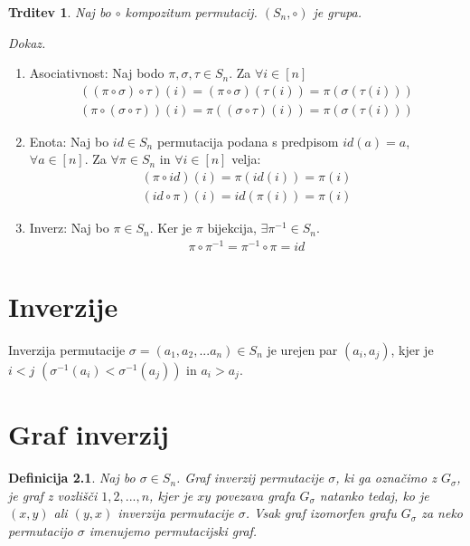 \documentclass[a4paper, 12pt]{book}
\newtheorem{definicija}{Definicija}[chapter]
\newtheorem{trditev}{Trditev}[chapter]
\newenvironment{dokaz}{\emph{Dokaz.}\ }{\hspace{\fill}{$\Box$}}
\begin{document}
\begin{trditev}
    Naj bo $\circ$ kompozitum permutacij. $(S_n, \circ)$ je grupa.
\end{trditev}
\begin{dokaz}
    \begin{enumerate}
        \item Asociativnost: Naj bodo $\pi, \sigma, \tau \in S_n$. Za $\forall i \in [n]$ 
        \begin{align}
            ((\pi \circ \sigma) \circ \tau)(i) = (\pi \circ \sigma)(\tau(i)) = \pi(\sigma(\tau(i)))\\
            (\pi \circ (\sigma \circ \tau))(i) = \pi((\sigma \circ \tau)(i)) = \pi(\sigma(\tau(i))) 
        \end{align}
        \item Enota: Naj bo $id \in S_n$ permutacija podana s predpisom $id(a) = a$, $\forall a \in [n]$. Za $\forall \pi \in S_n$ in $\forall i \in [n]$ velja:
        \begin{align}
            (\pi \circ id)(i) = \pi(id(i)) = \pi(i) \\
            (id \circ \pi)(i) = id(\pi(i)) = \pi(i)
        \end{align}
        \item Inverz: Naj bo $\pi \in S_n$. Ker je $\pi$ bijekcija, $\exists \pi^{-1} \in S_n$.
        \begin{align}
            \pi \circ \pi^{-1} = \pi^{-1} \circ \pi = id
        \end{align}
    \end{enumerate}
\end{dokaz}

\chapter{ Inverzije }

Inverzija permutacije $\sigma = (a_1, a_2,... a_n) \in S_n$ je urejen par $(a_i, a_j)$, kjer je $i < j$ $(\sigma^{-1}(a_i) < \sigma^{-1}(a_j))$ in $a_i > a_j$.

\chapter{ Graf inverzij }

\begin{definicija}
    Naj bo $\sigma \in S_n$. Graf inverzij permutacije $\sigma$, ki ga označimo z $G_{\sigma}$,  je graf z vozlišči $1, 2,..., n$, kjer je $xy$ povezava grafa $G_{\sigma}$ natanko tedaj, ko je $(x, y)$ ali $(y, x)$ inverzija permutacije $\sigma$. Vsak graf izomorfen grafu $G_{\sigma}$ za neko permutacijo $\sigma$ imenujemo permutacijski graf.
\end{definicija}
\end{document}
